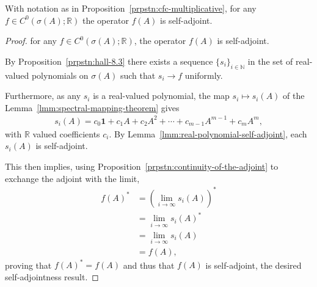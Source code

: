 \begin{proposition}
    \label{prpstn:cfc-self-adjoint}
    \leanok
    With notation as in Proposition~\ref{prpstn:cfc-multiplicative}, for any $f \in C^0(\sigma(A); \mathbb{R})$ the operator $f(A)$ is self-adjoint.
\end{proposition}
\begin{proof}
    \leanok
for any $f \in C^0(\sigma(A); \mathbb{R})$, the operator $f(A)$ is self-adjoint.

By Proposition~\ref{prpstn:hall-8.3} there exists a sequence $\{ s_i \}_{i \in \mathbb{N}}$ in the set of real-valued polynomials on $\sigma(A)$ such that $s_i \rightarrow f$ uniformly.

Furthermore, as any $s_i$ is a real-valued polynomial, the map $s_i \mapsto s_i(A)$ of the Lemma~\ref{lmm:spectral-mapping-theorem} gives
\begin{align}
    s_i(A) = c_0 \mathbf{1} + c_1 A + c_2 A^2 + \cdots + c_{m - 1} A^{m - 1} + c_m A^m,
\end{align}
with $\mathbb{R}$ valued coefficients $c_i$. By Lemma~\ref{lmm:real-polynomial-self-adjoint}, each $s_i(A)$ is self-adjoint.

This then implies, using Proposition~\ref{prpstn:continuity-of-the-adjoint} to exchange the adjoint with the limit,
\begin{align}
    f(A)^* &= \left( \lim_{i \rightarrow \infty} s_i(A) \right)^* \\
           &= \lim_{i \rightarrow \infty} s_i(A)^* \\
           &= \lim_{i \rightarrow \infty} s_i(A) \\
           &= f(A),
\end{align}
proving that $f(A)^* = f(A)$ and thus that $f(A)$ is self-adjoint, the desired self-adjointness result.
\end{proof}

